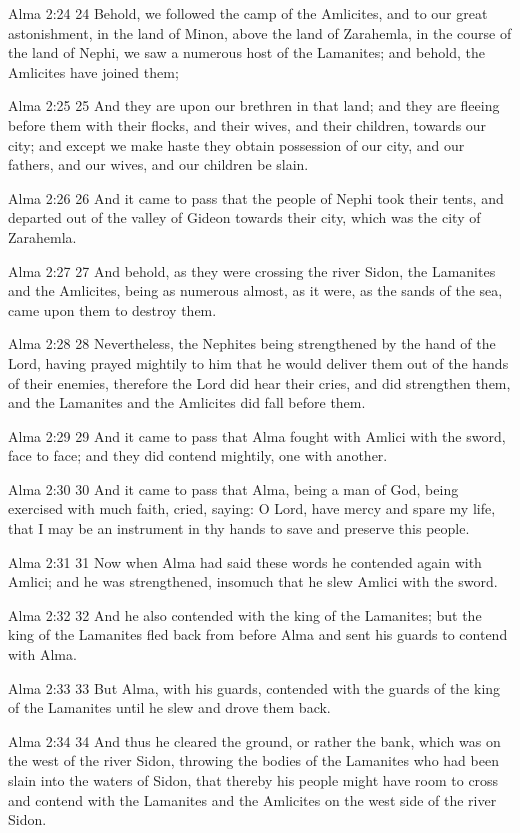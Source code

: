 Alma 2:24
 24 Behold, we followed the camp of the Amlicites, and to our
great astonishment, in the land of Minon, above the land of
Zarahemla, in the course of the land of Nephi, we saw a numerous
host of the Lamanites; and behold, the Amlicites have joined
them;

Alma 2:25
 25 And they are upon our brethren in that land; and they are
fleeing before them with their flocks, and their wives, and their
children, towards our city; and except we make haste they obtain
possession of our city, and our fathers, and our wives, and our
children be slain.

Alma 2:26
 26 And it came to pass that the people of Nephi took their
tents, and departed out of the valley of Gideon towards their
city, which was the city of Zarahemla.

Alma 2:27
 27 And behold, as they were crossing the river Sidon, the
Lamanites and the Amlicites, being as numerous almost, as it
were, as the sands of the sea, came upon them to destroy them.

Alma 2:28
 28 Nevertheless, the Nephites being strengthened by the hand of
the Lord, having prayed mightily to him that he would deliver
them out of the hands of their enemies, therefore the Lord did
hear their cries, and did strengthen them, and the Lamanites and
the Amlicites did fall before them.

Alma 2:29
 29 And it came to pass that Alma fought with Amlici with the
sword, face to face; and they did contend mightily, one with
another.

Alma 2:30
 30 And it came to pass that Alma, being a man of God, being
exercised with much faith, cried, saying: O Lord, have mercy and
spare my life, that I may be an instrument in thy hands to save
and preserve this people.

Alma 2:31
 31 Now when Alma had said these words he contended again with
Amlici; and he was strengthened, insomuch that he slew Amlici
with the sword.

Alma 2:32
 32 And he also contended with the king of the Lamanites; but the
king of the Lamanites fled back from before Alma and sent his
guards to contend with Alma.

Alma 2:33
 33 But Alma, with his guards, contended with the guards of the
king of the Lamanites until he slew and drove them back.

Alma 2:34
 34 And thus he cleared the ground, or rather the bank, which was
on the west of the river Sidon, throwing the bodies of the
Lamanites who had been slain into the waters of Sidon, that
thereby his people might have room to cross and contend with the
Lamanites and the Amlicites on the west side of the river Sidon.


